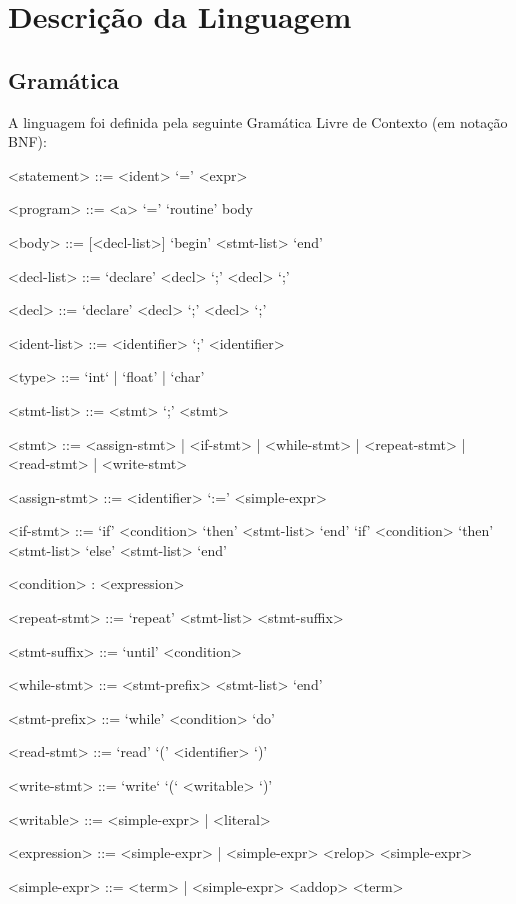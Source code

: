 \chapter{Descrição da Linguagem}
\label{cap:descricaoLinguagem}

\section{Gramática}
\label{sec:gramatica}

A linguagem foi definida pela seguinte Gramática Livre de Contexto (em notação BNF):

\begin{grammar}

<statement> ::= <ident> `=' <expr>

<program> ::= <a> `=' `routine' body

<body> ::= [<decl-list>] `begin' <stmt-list> `end'

<decl-list> ::= `declare' <decl> `;' {<decl> `;'}

<decl> ::= `declare' <decl> `;' {<decl> `;'}

<ident-list> ::= <identifier> {`;' <identifier>}

<type> ::= `int` | `float' | `char'

<stmt-list> ::= <stmt> {`;' <stmt>}

<stmt> ::= <assign-stmt> | <if-stmt> | <while-stmt> | <repeat-stmt> | <read-stmt> | <write-stmt>

<assign-stmt> ::= <identifier> `:=' <simple-expr>

<if-stmt> ::= `if' <condition> `then' <stmt-list> `end'
              \alt `if' <condition> `then' <stmt-list> `else' <stmt-list> `end'
              
<condition> : <expression>

<repeat-stmt> ::= `repeat' <stmt-list> <stmt-suffix>

<stmt-suffix> ::= `until' <condition>

<while-stmt> ::= <stmt-prefix> <stmt-list> `end'

<stmt-prefix> ::= `while' <condition> `do'

<read-stmt> ::= `read' `(' <identifier> `)'

<write-stmt> ::= `write` `(` <writable> `)'

<writable> ::= <simple-expr> | <literal>

<expression> ::= <simple-expr> | <simple-expr> <relop> <simple-expr>

<simple-expr> ::= <term> | <simple-expr> <addop> <term>


\end{grammar}

